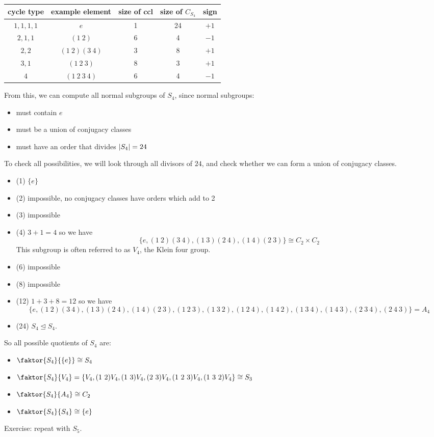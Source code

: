 \begin{center}
	\begin{tabular}{ccccc}
		cycle type  & example element  & size of ccl & size of \(C_{S_4}\) & sign   \\\midrule
		\(1,1,1,1\) & \(e\)            & 1           & 24                  & \(+1\) \\
		\(2,1,1\)   & \((1\ 2)\)       & 6           & 4                   & \(-1\) \\
		\(2,2\)     & \((1\ 2)(3\ 4)\) & 3           & 8                   & \(+1\) \\
		\(3,1\)     & \((1\ 2\ 3)\)    & 8           & 3                   & \(+1\) \\
		\(4\)       & \((1\ 2\ 3\ 4)\) & 6           & 4                   & \(-1\) \\
	\end{tabular}
\end{center}

From this, we can compute all normal subgroups of \(S_4\), since normal subgroups:
\begin{itemize}
	\item must contain \(e\)
	\item must be a union of conjugacy classes
	\item must have an order that divides \(\abs{S_4} = 24\)
\end{itemize}
To check all possibilities, we will look through all divisors of \(24\), and check whether we can form a union of conjugacy classes.
\begin{itemize}
	\item (1) \(\{ e \}\)
	\item (2) impossible, no conjugacy classes have orders which add to 2
	\item (3) impossible
	\item (4) \(3+1=4\) so we have
	      \[
		      \{ e, (1\ 2)(3\ 4), (1\ 3)(2\ 4), (1\ 4)(2\ 3) \} \cong C_2 \times C_2
	      \]
	      This subgroup is often referred to as \(V_4\), the Klein four group.
	\item (6) impossible
	\item (8) impossible
	\item (12) \(1+3+8=12\) so we have
	      \[
		      \{ e, (1\ 2)(3\ 4), (1\ 3)(2\ 4), (1\ 4)(2\ 3), (1\ 2\ 3), (1\ 3\ 2), (1\ 2\ 4), (1\ 4\ 2), (1\ 3\ 4), (1\ 4\ 3), (2\ 3\ 4), (2\ 4\ 3) \} = A_4
	      \]
	\item (24) \(S_4 \trianglelefteq S_4\).
\end{itemize}
So all possible quotients of \(S_4\) are:
\begin{itemize}
	\item \(\faktor{S_4}{\{ e \}} \cong S_4\)
	\item \(\faktor{S_4}{V_4} = \{ V_4, (1\ 2)V_4, (1\ 3)V_4, (2\ 3)V_4, (1\ 2\ 3)V_4, (1\ 3\ 2)V_4 \} \cong S_3\)
	\item \(\faktor{S_4}{A_4} \cong C_2\)
	\item \(\faktor{S_4}{S_4} \cong \{ e \}\)
\end{itemize}
Exercise: repeat with \(S_5\).

